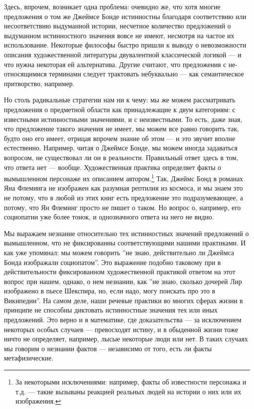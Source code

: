 \documentclass[11pt]{book}
\begin{document}
Здесь, впрочем, возникает одна проблема: очевидно же, что хотя многие предложения о том же Джеймсе Бонде истинностны благодаря соответствию или несоответствию выдуманной истории, несчетное количество предложений о выдуманном истинностного значения вовсе не имеют, несмотря на частое их использование. Некоторые философы быстро пришли к выводу о невозможности описания художественной литературы двувалентной классической логикой --- и что нужна некоторая ей альтернатива. Другие считают, что предложения с не-относящимися терминами следует трактовать небуквально --- как семантическое притворство, например.

Но столь радикальные стратегии нам ни к чему: мы же можем рассматривать предложения о предметной области как принадлежащие к двум категориям: с известными истинностными значениями, и с неизвестными. То есть, даже зная, что предложение такого значения не имеет, мы можем все равно говорить так, будто оно его имеет, отрицая впрочем знание об этом --- и это звучит вполне естественно. Например, читая о Джеймсе Бонде, мы можем иногда задаваться вопросом, не существовал ли он в реальности. Правильный ответ здесь в том, что ответа нет --- вообще. Художественная практика определяет факты о вымышленном персонаже их описанием автором.\footnote{За некоторыми исключениями: например, факты об известности персонажа и т.д. --- такие вызываны реакцией реальных людей на истории о них или их изображения.} Так, Джеймс Бонд в романах Яна Флеминга не изображен как разумная рептилия из космоса, и мы знаем это не потому, что в любой из этих книг есть предложение это подразумевающее, а потому, что Ян Флеминг просто не пишет о таком. Но вопрос о, например, его социопатии уже более тонок, и однозначного ответа на него не видно.

Мы выражаем незнание относительно тех истинностных значений предложений о вымышленном, что не фиксированны соответствующими нашими практиками. И как уже упомянал: мы можем говорить ''не знаю, действительно ли Джеймса Бонда изображали социопатом''. Это выражение подобно таковому при в действительности фиксированном художественной практикой ответом на этот вопрос при нашем, однако, о нем незнании, как ''не знаю, сколько дочерей Лир изображено в пьесе Шекспира, но, если надо, могу поискать про это в Википедии''. На самом деле, наши речевые практики во многих сферах жизни в принципе не способны диктовать истинностные значения тех или иных предложений. Это верно и в математике, где доказательства --- за исключением некоторых особых случаев --- превосходят истину, и в обыденной жизни тоже ничто не определяет, например, лысые некоторые люди или нет. В таких случаях мы говорим о незнании фактов --- независимо от того, есть ли факты метафизические.
\end{document}
